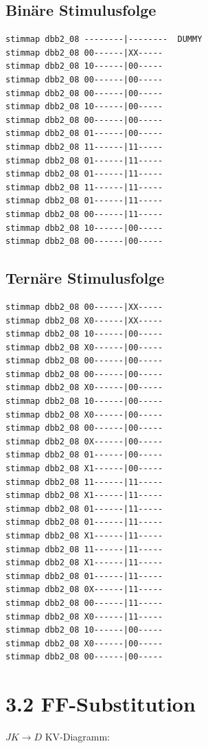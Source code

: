 \documentclass[fleqn]{article}
\begin{document}
\subsection{Binäre Stimulusfolge}
\begin{lstlisting}
stimmap dbb2_08 --------|--------  DUMMY
stimmap dbb2_08 00------|XX-----
stimmap dbb2_08 10------|00-----
stimmap dbb2_08 00------|00-----
stimmap dbb2_08 00------|00-----
stimmap dbb2_08 10------|00-----
stimmap dbb2_08 00------|00-----
stimmap dbb2_08 01------|00-----
stimmap dbb2_08 11------|11-----
stimmap dbb2_08 01------|11-----
stimmap dbb2_08 01------|11-----
stimmap dbb2_08 11------|11-----
stimmap dbb2_08 01------|11-----
stimmap dbb2_08 00------|11-----
stimmap dbb2_08 10------|00-----
stimmap dbb2_08 00------|00-----
\end{lstlisting}

\subsection{Ternäre Stimulusfolge}
\begin{lstlisting}
stimmap dbb2_08 00------|XX-----
stimmap dbb2_08 X0------|XX-----
stimmap dbb2_08 10------|00-----
stimmap dbb2_08 X0------|00-----
stimmap dbb2_08 00------|00-----
stimmap dbb2_08 00------|00-----
stimmap dbb2_08 X0------|00-----
stimmap dbb2_08 10------|00-----
stimmap dbb2_08 X0------|00-----
stimmap dbb2_08 00------|00-----
stimmap dbb2_08 0X------|00-----
stimmap dbb2_08 01------|00-----
stimmap dbb2_08 X1------|00-----
stimmap dbb2_08 11------|11-----
stimmap dbb2_08 X1------|11-----
stimmap dbb2_08 01------|11-----
stimmap dbb2_08 01------|11-----
stimmap dbb2_08 X1------|11-----
stimmap dbb2_08 11------|11-----
stimmap dbb2_08 X1------|11-----
stimmap dbb2_08 01------|11-----
stimmap dbb2_08 0X------|11-----
stimmap dbb2_08 00------|11-----
stimmap dbb2_08 X0------|11-----
stimmap dbb2_08 10------|00-----
stimmap dbb2_08 X0------|00-----
stimmap dbb2_08 00------|00-----
\end{lstlisting}

\section{3.2 FF-Substitution}

$JK\rightarrow D$ \qquad \qquad \qquad \qquad \qquad \qquad \qquad KV-Diagramm:
\end{document}

